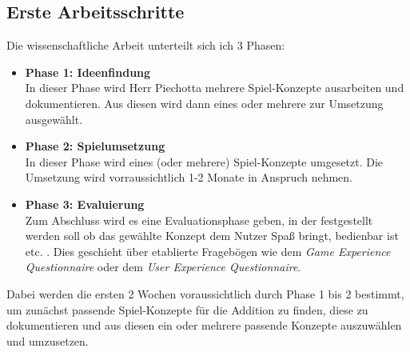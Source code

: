 \documentclass[a4paper]{article}
\begin{document}
\subsection{Erste Arbeitsschritte}
Die wissenschaftliche Arbeit unterteilt sich ich 3 Phasen:\\
\begin{itemize}
\item \textbf{Phase 1: Ideenfindung}\\In dieser Phase wird Herr Piechotta mehrere Spiel-Konzepte ausarbeiten und dokumentieren. Aus diesen wird dann eines oder mehrere zur Umsetzung ausgewählt.
\item \textbf{Phase 2: Spielumsetzung}\\In dieser Phase wird eines (oder mehrere) Spiel-Konzepte umgesetzt. Die Umsetzung wird vorraussichtlich 1-2 Monate in Anspruch nehmen.
\item \textbf{Phase 3: Evaluierung}\\Zum Abschluss wird es eine Evaluationsphase geben, in der festgestellt werden soll ob das gewählte Konzept dem Nutzer Spaß bringt, bedienbar ist etc. . Dies geschieht über etablierte Fragebögen wie dem \textit{Game Experience Questionnaire} oder dem \textit{User Experience Questionnaire}.
\end{itemize}
Dabei werden die ersten 2 Wochen voraussichtlich durch Phase 1 bis 2 bestimmt, um zunächst passende Spiel-Konzepte für die Addition zu finden, diese zu dokumentieren und aus diesen ein oder mehrere passende Konzepte auszuwählen und umzusetzen.
\end{document}
